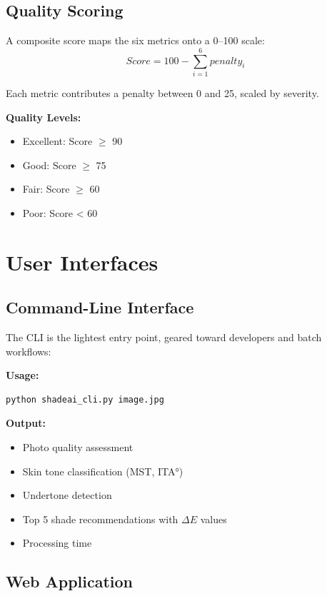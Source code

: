 \subsection{Quality Scoring}

A composite score maps the six metrics onto a 0–100 scale:
\begin{equation}
Score = 100 - \sum_{i=1}^{6} penalty_i
\end{equation}

Each metric contributes a penalty between 0 and 25, scaled by severity.

\textbf{Quality Levels:}
\begin{itemize}
    \item Excellent: Score $\geq$ 90
    \item Good: Score $\geq$ 75
    \item Fair: Score $\geq$ 60
    \item Poor: Score < 60
\end{itemize}

\section{User Interfaces}

\subsection{Command-Line Interface}

The CLI is the lightest entry point, geared toward developers and batch workflows:

\textbf{Usage:}
\begin{verbatim}
python shadeai_cli.py image.jpg
\end{verbatim}

\textbf{Output:}
\begin{itemize}
    \item Photo quality assessment
    \item Skin tone classification (MST, ITA°)
    \item Undertone detection
    \item Top 5 shade recommendations with $\Delta E$ values
    \item Processing time
\end{itemize}

\subsection{Web Application}

